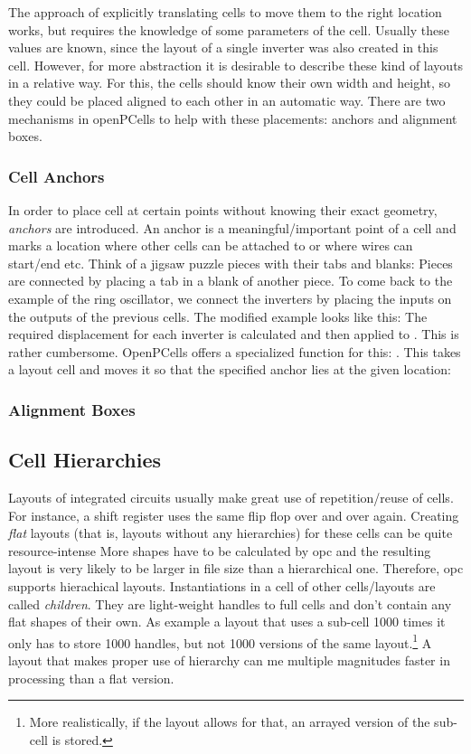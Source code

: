 The approach of explicitly translating cells to move them to the right location works, but requires the knowledge of some parameters of the cell.
Usually these values are known, since the layout of a single inverter was also created in this cell.
However, for more abstraction it is desirable to describe these kind of layouts in a relative way.
For this, the cells should know their own width and height, so they could be placed aligned to each other in an automatic way.
There are two mechanisms in openPCells to help with these placements: anchors and alignment boxes.

\subsubsection{Cell Anchors}
In order to place cell at certain points without knowing their exact geometry, \emph{anchors} are introduced.
An anchor is a meaningful/important point of a cell and marks a location where other cells can be attached to or where wires can start/end etc.
Think of a jigsaw puzzle pieces with their tabs and blanks: Pieces are connected by placing a tab in a blank of another piece.
To come back to the example of the ring oscillator, we connect the inverters by placing the inputs on the outputs of the previous cells.
The modified example looks like this:
The required displacement for each inverter is calculated and then applied to .
This is rather cumbersome.
OpenPCells offers a specialized function for this: .
This takes a layout cell and moves it so that the specified anchor lies at the given location:

\subsubsection{Alignment Boxes}

\subsection{Cell Hierarchies}\label{sec:hierarchies}
Layouts of integrated circuits usually make great use of repetition/reuse of cells.
For instance, a shift register uses the same flip flop over and over again.
Creating \emph{flat} layouts (that is, layouts without any hierarchies) for these cells can be quite resource-intense
More shapes have to be calculated by opc and the resulting layout is very likely to be larger in file size than a hierarchical one.
Therefore, opc supports hierachical layouts.
Instantiations in a cell of other cells/layouts are called \emph{children}.
They are light-weight handles to full cells and don't contain any flat shapes of their own.
As example a layout that uses a sub-cell 1000 times it only has to store 1000 handles, but not 1000 versions of the same layout.\footnote{More realistically, if the layout allows for that, an arrayed version of the sub-cell is stored.}
A layout that makes proper use of hierarchy can me multiple magnitudes faster in processing than a flat version.


